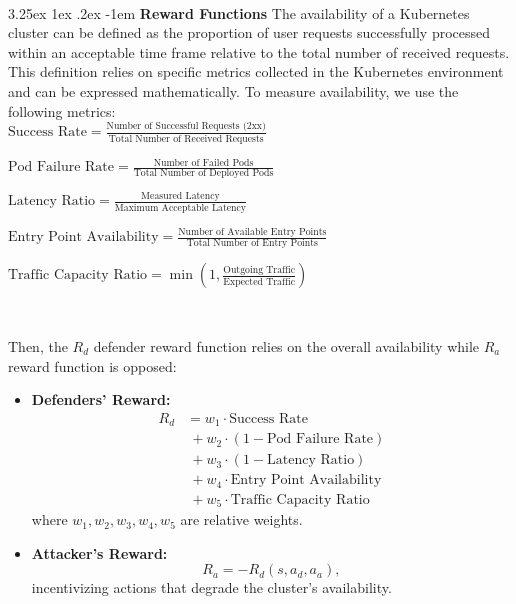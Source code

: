 \documentclass[conference]{IEEEtran}
\makeatletter
\renewcommand\paragraph{\@startsection{paragraph}{5}{\z@}%
  {3.25ex \@plus1ex \@minus.2ex}%
  {-1em}%
  {\normalfont\normalsize\bfseries}}
\makeatother
\begin{document}
\

\noindent \paragraph{\textbf{Reward Functions}} The availability of a Kubernetes cluster can be defined as the proportion of user requests successfully processed within an acceptable time frame relative to the total number of received requests. This definition relies on specific metrics collected in the Kubernetes environment and can be expressed mathematically.
To measure availability, we use the following metrics:\\

\noindent $
\text{Success Rate} = \frac{\text{Number of Successful Requests (2xx)}}{\text{Total Number of Received Requests}}
$

\noindent $
\text{Pod Failure Rate} = \frac{\text{Number of Failed Pods}}{\text{Total Number of Deployed Pods}}
$

\noindent $
\text{Latency Ratio} = \frac{\text{Measured Latency}}{\text{Maximum Acceptable Latency}}
$

\noindent $
\text{Entry Point Availability} = \frac{\text{Number of Available Entry Points}}{\text{Total Number of Entry Points}}
$

\noindent $
\text{Traffic Capacity Ratio} = \min\left(1, \frac{\text{Outgoing Traffic}}{\text{Expected Traffic}}\right)
$

\

\noindent Then, the $R_d$ defender reward function relies on the overall availability while $R_a$ reward function is opposed:
\begin{itemize}
    \item \textbf{Defenders' Reward:}
    \begin{align*}
        R_d & = w_1 \cdot \text{Success Rate} \\
            & \ + w_2 \cdot (1 - \text{Pod Failure Rate}) \\
            & \ + w_3 \cdot (1 - \text{Latency Ratio}) \\
            & \ + w_4 \cdot \text{Entry Point Availability} \\
            & \ + w_5 \cdot \text{Traffic Capacity Ratio}
    \end{align*}
    where \(w_1, w_2, w_3, w_4, w_5\) are relative weights.
    \item \textbf{Attacker's Reward:}
    $$
    R_a = -R_d(s, a_d, a_a),
    $$
    incentivizing actions that degrade the cluster's availability.
\end{itemize}
\end{document}
